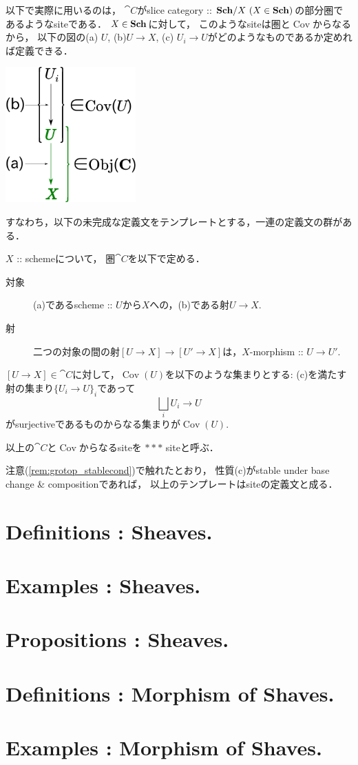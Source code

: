 \documentclass[a4paper]{jsarticle}
\newcommand{\Cov}{\operatorname{Cov}}
\begin{document}
以下で実際に用いるのは，
$\cat{C}$がslice category :: $\mathbf{Sch}/X \ (X \in \mathbf{Sch})$の部分圏であるようなsiteである．
$X \in \mathbf{Sch}$に対して，
このようなsiteは圏と$\Cov$からなるから，
以下の図の(a) $U$, (b)$U \to X$, (c) $U_i \to U$がどのようなものであるか定めれば定義できる．
\begin{center}
     \includegraphics[width=5cm]{./images/site.pdf}
\end{center}
すなわち，以下の未完成な定義文をテンプレートとする，一連の定義文の群がある．
\begin{Def}[$***$ site]
    $X$ :: schemeについて，
    圏$\cat{C}$を以下で定める．
    \begin{description}
        \item[対象] (a)であるscheme :: $U$から$X$への，(b)である射$U \to X$.
        \item[射]   二つの対象の間の射$[U \to X] \to [U' \to X]$は，$X$-morphism :: $U \to U'$.
    \end{description}
    $[U \to X] \in \cat{C}$に対して，$\Cov(U)$を以下のような集まりとする:
    (c)を満たす射の集まり$\{U_i \to U\}_i$であって
    \[ \bigsqcup_i U_i \to U \]
    がsurjectiveであるものからなる集まりが$\Cov(U)$.

    以上の$\cat{C}$と$\Cov$からなるsiteを $***$ siteと呼ぶ．
\end{Def}

注意(\ref{rem:grotop_stablecond})で触れたとおり，
性質(c)がstable under base change \& compositionであれば，
以上のテンプレートはsiteの定義文と成る．

\begin{Def}
\end{Def}

\section{Definitions : Sheaves.}

\section{Examples : Sheaves.}

\section{Propositions : Sheaves.}

\section{Definitions : Morphism of Shaves.}

\section{Examples : Morphism of Shaves.}




\end{document}
